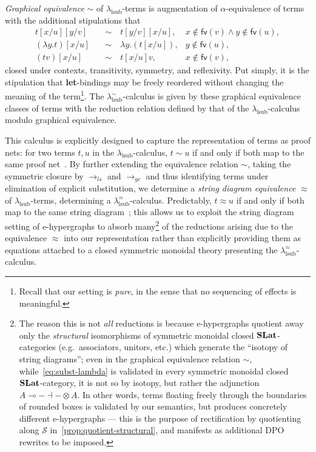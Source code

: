 \emph{Graphical equivalence} $\sim$ of $\lambda_{\text{lsub}}$-terms is augmentation of $\alpha$-equivalence of terms with the additional stipulations that
\begin{align}
	t [x/u] [y/v] \quad        & \sim \quad t [y/v] [x/u],        & x \notin \textsf{fv} (v) \land y \notin \textsf{fv} (u), \nonumber \\
	\label{eq:subst-lambda}
	(\lambda y. t) [x/u] \quad & \sim \quad \lambda y. (t [x/u]), & y \notin \textsf{fv} (u), \tag{$\ast$}                             \\
	(t v) [x/u] \quad          & \sim \quad t [x/u] v,            & x \notin \textsf{fv} (v), \nonumber
\end{align}
closed under contexts, transitivity, symmetry, and reflexivity.
Put simply, it is the stipulation that \textbf{let}-bindings may be freely reordered without changing the meaning of the term\footnote{Recall that our setting is \emph{pure}, in the sense that no sequencing of effects is meaningful.}.
The $\lambda^\sim_{\text{lsub}}$-calculus is given by these graphical equivalence classes of terms with the reduction relation defined by that of the $\lambda_{\text{lsub}}$-calculus modulo graphical equivalence.

This calculus is explicitly designed to capture the representation of terms as proof nets: for two terms $t, u$ in the $\lambda_{\text{lsub}}$-calculus, $t \sim u$ if and only if both map to the same proof net~\cite{?}.
By further extending the equivalence relation $\sim$, taking the symmetric closure by $\to_{ls}$ and $\to_{gc}$ and thus identifying terms under elimination of explicit substitution, we determine a \emph{string diagram equivalence} $\approx$ of $\lambda_{\text{lsub}}$-terms, determining a $\lambda^\approx_{\text{lsub}}$-calculus.
Predictably, $t \approx u$ if and only if both map to the same string diagram~\cite[§ 5.1.1]{ghica2024stringdiagramslambdacalculifunctional}; this allows us to exploit the string diagram setting of e-hypergraphs to absorb many\footnote{The reason this is not \emph{all} reductions is because e-hypergraphs quotient away only the \emph{structural} isomorphisms of symmetric monoidal closed $\mathbf{SLat}$-categories (e.g.\ associators, unitors, etc.) which generate the \enquote{isotopy of string diagrams}; even in the graphical equivalence relation $\sim$, while~\autoref{eq:subst-lambda} is validated in every symmetric monoidal closed $\mathbf{SLat}$-category, it is not so by isotopy, but rather the adjunction $A \multimap - \dashv - \otimes A$. In other words, terms floating freely through the boundaries of rounded boxes is validated by our semantics, but produces concretely different e-hypergraphs --- this is the purpose of rectification by quotienting along $\mathcal{S}$ in~\autoref{prop:quotient-structural}, and manifests as additional DPO rewrites to be imposed.} of the reductions arising due to the equivalence $\approx$ into our representation rather than explicitly providing them as equations attached to a closed symmetric monoidal theory presenting the $\lambda^\approx_{\text{lsub}}$-calculus.

